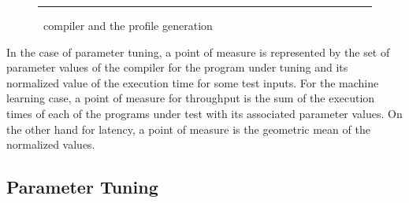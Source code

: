 \begin{figure}
  \centering
  
  \begin{minipage}[t]{\linewidth}
    \vspace{1em}
    \hrule
    \vspace{1em}
  \end{minipage}
  \caption{\CP\ compiler and the profile generation}
  \label{fig:CPview}
\end{figure}


In the case of parameter tuning, a point of measure is represented by
the set of parameter values of the compiler for the program under tuning
and its normalized value of the execution time for some test inputs. For
the machine learning case, a point of measure for throughput is the sum
of the execution times of each of the programs under test with its
associated parameter values. On the other hand for latency, a point of
measure is the geometric mean of the normalized values.

\subsection{Parameter Tuning}

